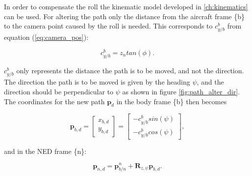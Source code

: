 In order to compensate the roll the kinematic model developed in \ref{ch:kinematics} can be used. For altering the path only the distance from the aircraft frame \{b\} to the camera point caused by the roll is needed. This corresponds to $c_{y/b}^b$ from equation (\ref{eq:camera_pos}):

\begin{equation}
	c_{y/b}^b = z_ntan(\phi).
\end{equation}

$c_{y/b}^b$ only represents the distance the path is to be moved, and not the direction. The direction the path is to be moved is given by the heading $\psi$, and the direction should be perpendicular to $\psi$ as shown in figure \ref{fig:path_alter_dir}. The coordinates for the new path $\bm{p}_d$ in the body frame \{b\} then becomes

\begin{equation}
	\bm{p}_{b,d} =
	\begin{bmatrix}
		x_{b,d} \\ y_{b,d}
	\end{bmatrix}
	=
	\begin{bmatrix}
		-c_{y/b}^b sin(\psi) \\
		-c_{y/b}^b cos(\psi)
	\end{bmatrix},
\end{equation}

and in the NED frame \{n\}:

\begin{equation}
	\bm{p}_{n,d} = \bm{p}_{b/n}^n + \bm{R}_{z,\psi}\bm{p}_{b,d}.
\end{equation}